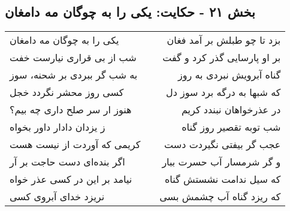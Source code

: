 \begin{center}
\section*{بخش ۲۱ - حکایت: یکی را به چوگان مه دامغان}
\label{sec:021}
\begin{longtable}{l p{0.5cm} r}
یکی را به چوگان مه دامغان
&&
بزد تا چو طبلش بر آمد فغان
\\
شب از بی قراری نیارست خفت
&&
بر او پارسایی گذر کرد و گفت
\\
به شب گر ببردی بر شحنه، سوز
&&
گناه آبرویش نبردی به روز
\\
کسی روز محشر نگردد خجل
&&
که شبها به درگه برد سوز دل
\\
هنوز ار سر صلح داری چه بیم؟
&&
در عذرخواهان نبندد کریم
\\
ز یزدان دادار داور بخواه
&&
شب توبه تقصیر روز گناه
\\
کریمی که آوردت از نیست هست
&&
عجب گر بیفتی نگیردت دست
\\
اگر بنده‌ای دست حاجت بر آر
&&
و گر شرمسار آب حسرت ببار
\\
نیامد بر این در کسی عذر خواه
&&
که سیل ندامت نشستش گناه
\\
نریزد خدای آبروی کسی
&&
که ریزد گناه آب چشمش بسی
\\
\end{longtable}
\end{center}
